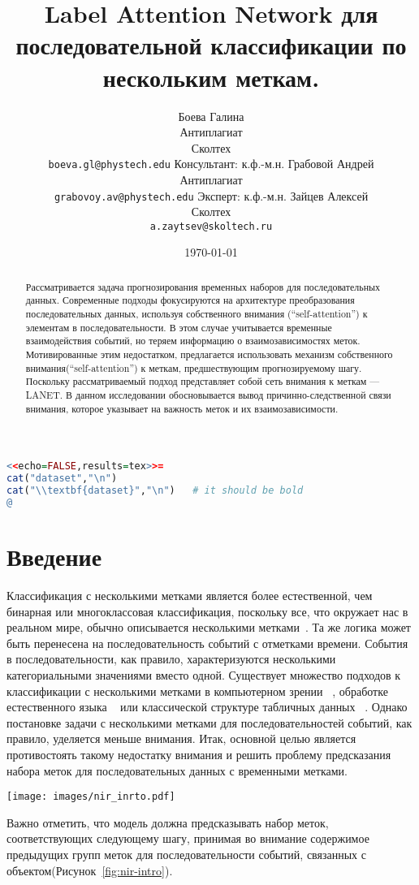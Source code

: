 \documentclass[a4paper, 12pt]{article} %
\title{Label Attention Network для последовательной классификации по нескольким меткам.}
\author{ Боева Галина\\
	Антиплагиат\\
	Сколтех\\ 
	\texttt{boeva.gl@phystech.edu} 
	\AND
        Консультант: к.ф.-м.н. Грабовой Андрей\\
	Антиплагиат\\
	\texttt{grabovoy.av@phystech.edu} 
        \AND
        Эксперт: к.ф.-м.н. Зайцев Алексей\\
	Сколтех\\
	\texttt{a.zaytsev@skoltech.ru}
}
\date{\today}
\begin{document}
\begin{lstlisting}[language=R]
%chunk = 1
<<echo=FALSE,results=tex>>=
cat("dataset","\n")
cat("\\textbf{dataset}","\n")   # it should be bold
@
\end{lstlisting}
\maketitle

\begin{abstract}
Рассматривается задача прогнозирования временных наборов для последовательных данных. Современные подходы фокусируются на архитектуре преобразования последовательных данных, используя собственного внимания (``self-attention'') к элементам в последовательности. В этом случае учитывается временные взаимодействия событий, но теряем информацию о взаимозависимостях меток. Мотивированные этим недостатком, предлагается использовать механизм собственного внимания(``self-attention'') к меткам, предшествующим прогнозируемому шагу. Поскольку рассматриваемый подход представляет собой сеть внимания к меткам --- LANET. В данном исследовании обосновывается вывод причинно-следственной связи внимания, которое указывает на важность меток и их взаимозависимости.
\end{abstract}



\section{Введение}
Классификация с несколькими метками является более естественной, чем бинарная или многоклассовая классификация, поскольку все, что окружает нас в реальном мире, обычно описывается несколькими метками~\cite{liu2021emerging}. Та же логика может быть перенесена на последовательность событий с отметками времени. События в последовательности, как правило, характеризуются несколькими категориальными значениями вместо одной. Существует множество подходов к классификации с несколькими метками в компьютерном зрении ~\cite{durand2019learning}, обработке естественного языка ~\cite{xiao2019label} или классической структуре табличных данных ~\cite{tarekegn2021review}. Однако постановке задачи с несколькими метками для последовательностей событий, как правило, уделяется меньше внимания. Итак, основной целью является противостоять такому недостатку внимания и решить проблему предсказания набора меток для последовательных данных с временными метками.  
\begin{figure*}
    \centering
    \texttt{[image: images/nir\_inrto.pdf]}
    \caption{На рисунке показано визуальное представление постановки задачи. Наша модель должна предсказать метки для момента времени $t_4$, учитывая историю предыдущих наборов меток. Требуется предсказать несколько меток, так что это определение задачи классификации с несколькими метками.}
    \label{fig:nir-intro}
\end{figure*}
Важно отметить, что модель должна предсказывать набор меток, соответствующих следующему шагу, принимая во внимание содержимое предыдущих групп меток для последовательности событий, связанных с объектом(Рисунок~\ref{fig:nir-intro}).
\end{document}
